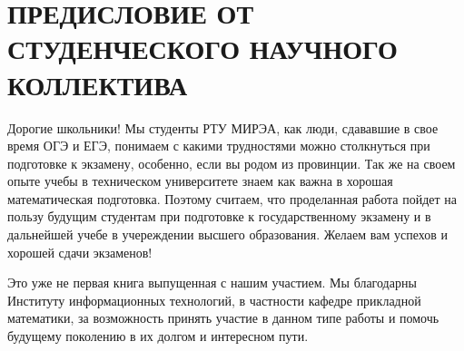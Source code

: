 \chapter*{ПРЕДИСЛОВИЕ ОТ СТУДЕНЧЕСКОГО НАУЧНОГО КОЛЛЕКТИВА}

Дорогие школьники! Мы студенты РТУ МИРЭА, как люди, сдававшие в свое время ОГЭ и ЕГЭ, понимаем с какими трудностями можно столкнуться при подготовке к экзамену, особенно, если вы родом из провинции. Так же на своем опыте учебы в техническом университете знаем как важна в хорошая математическая подготовка. Поэтому считаем, что проделанная работа пойдет на пользу будущим студентам при подготовке к государственному экзамену и в дальнейшей учебе в учереждении высшего образования. Желаем вам успехов и хорошей сдачи экзаменов!

Это уже не первая книга выпущенная с нашим участием. Мы благодарны Институту информационных технологий, в частности кафедре прикладной математики, за возможность принять участие в данном типе работы и помочь будущему поколению в их долгом и интересном пути.